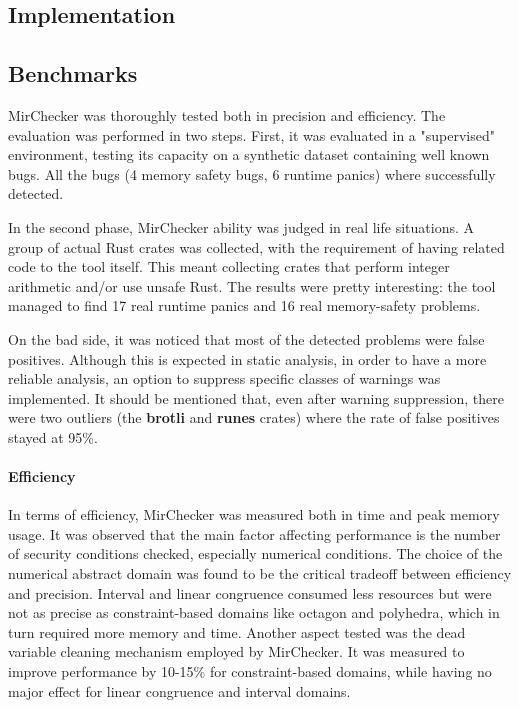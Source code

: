 \documentclass{article}
\begin{document}
\subsection*{Implementation}
\subsection*{Benchmarks}
MirChecker  was thoroughly tested both in precision and efficiency. The evaluation was performed
in two steps. First, it was evaluated in a "supervised" environment, testing its capacity on a synthetic dataset 
containing well known bugs. All the bugs (4 memory safety bugs, 6 runtime panics) where successfully detected. 

In the second phase, 
MirChecker ability was judged in real life situations. A group of actual Rust crates was collected, with the requirement of having related code to 
the tool itself. This meant collecting crates that perform integer arithmetic and/or use unsafe Rust. The results were pretty interesting: the tool managed to find
17 real runtime panics and 16 real memory-safety problems. 

On the bad side, it was noticed that most of the detected problems 
were false positives. Although this is expected in static analysis, in order to have
a more reliable analysis, an option to suppress specific classes of warnings was implemented. It should be mentioned that, even after warning suppression, there were two outliers (the \textbf{brotli} and \textbf{runes} crates) where the rate 
of false positives stayed at 95\%.

\paragraph*{Efficiency} In terms of efficiency, MirChecker was measured both in time and peak memory usage. It was observed that 
the main factor affecting performance is the number of security conditions checked, especially numerical conditions. The choice of the numerical abstract domain 
was found to be the critical tradeoff between efficiency and precision. Interval and linear congruence  consumed less resources but were not as precise as constraint-based domains 
like octagon and polyhedra, which in turn required more memory and time. Another aspect tested was  the dead variable cleaning mechanism 
employed by MirChecker. It was measured to improve performance by 
 10-15\% for constraint-based domains,  while having no major effect for linear congruence and interval domains. 
 
\end{document}
